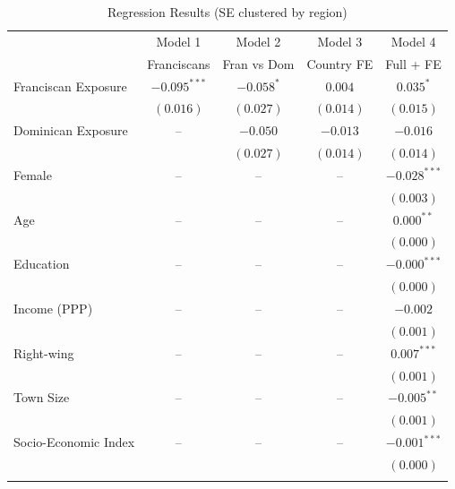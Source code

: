 \documentclass[12pt, a4paper]{article}
\begin{document}
\begin{table}[ht]
\centering
\caption{Regression Results (SE clustered by region)}
\label{tab:reg_results_horizontal}
\footnotesize
\renewcommand{\arraystretch}{0.9}
\setlength{\tabcolsep}{7pt}

\begin{tabular}{lcccc}
\toprule
 & Model 1 & Model 2 & Model 3 & Model 4 \\
 & Franciscans & Fran vs Dom & Country FE & Full + FE \\
\midrule

Franciscan Exposure 
& $-0.095^{***}$ 
& $-0.058^{*}$ 
& $0.004$ 
& $0.035^{*}$ \\
& $(0.016)$ & $(0.027)$ & $(0.014)$ & $(0.015)$ \\
\addlinespace[0.2em]

Dominican Exposure 
& -- 
& $-0.050$ 
& $-0.013$ 
& $-0.016$ \\
&  & $(0.027)$ & $(0.014)$ & $(0.014)$ \\

\midrule

Female 
& -- & -- & -- 
& $-0.028^{***}$ \\
&  &  &  & $(0.003)$ \\
\addlinespace[0.2em]

Age 
& -- & -- & -- 
& $0.000^{**}$ \\
&  &  &  & $(0.000)$ \\
\addlinespace[0.2em]

Education 
& -- & -- & -- 
& $-0.000^{***}$ \\
&  &  &  & $(0.000)$ \\
\addlinespace[0.2em]

Income (PPP) 
& -- & -- & -- 
& $-0.002$ \\
&  &  &  & $(0.001)$ \\
\addlinespace[0.2em]

Right-wing 
& -- & -- & -- 
& $0.007^{***}$ \\
&  &  &  & $(0.001)$ \\
\addlinespace[0.2em]

Town Size 
& -- & -- & -- 
& $-0.005^{**}$ \\
&  &  &  & $(0.001)$ \\
\addlinespace[0.2em]

Socio-Economic Index 
& -- & -- & -- 
& $-0.001^{***}$ \\
&  &  &  & $(0.000)$ \\
\addlinespace[0.2em]


\end{tabular}
\end{table}
\end{document}
